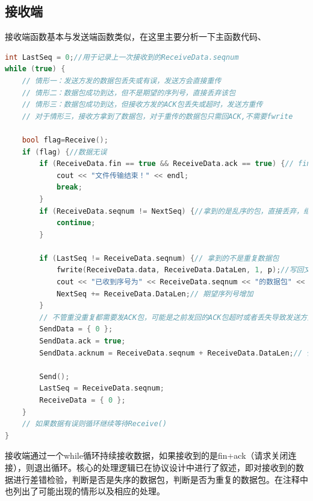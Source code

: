 \documentclass[UTF8,a4paper,10pt]{ctexart}
\begin{document}
\subsection{接收端}
接收端函数基本与发送端函数类似，在这里主要分析一下主函数代码、
\begin{lstlisting}[frame=trbl,language={C++}]
int LastSeq = 0;//用于记录上一次接收到的ReceiveData.seqnum
while (true) {
    // 情形一：发送方发的数据包丢失或有误，发送方会直接重传
    // 情形二：数据包成功到达，但不是期望的序列号，直接丢弃该包
    // 情形三：数据包成功到达，但接收方发的ACK包丢失或超时，发送方重传
    // 对于情形三，接收方拿到了数据包，对于重传的数据包只需回ACK,不需要fwrite
   
    bool flag=Receive();
    if (flag) {//数据无误
        if (ReceiveData.fin == true && ReceiveData.ack == true) {// fin+ack
            cout << "文件传输结束！" << endl;
            break;
        }
        if (ReceiveData.seqnum != NextSeq) {//拿到的是乱序的包，直接丢弃，继续Receive
            continue;
        }
        
        if (LastSeq != ReceiveData.seqnum) {// 拿到的不是重复数据包
            fwrite(ReceiveData.data, ReceiveData.DataLen, 1, p);//写回文件
            cout << "已收到序号为" << ReceiveData.seqnum << "的数据包" << endl;
            NextSeq += ReceiveData.DataLen;// 期望序列号增加
        }
        // 不管重没重复都需要发ACK包，可能是之前发回的ACK包超时或者丢失导致发送方重传（case3)
        SendData = { 0 };
        SendData.ack = true;
        SendData.acknum = ReceiveData.seqnum + ReceiveData.DataLen;// 代表acknum-2个字节流都已成功收到
        
        Send();
        LastSeq = ReceiveData.seqnum;
        ReceiveData = { 0 };
    }
    // 如果数据有误则循环继续等待Receive()
}
\end{lstlisting}\par
接收端通过一个while循环持续接收数据，如果接收到的是fin+ack（请求关闭连接），则退出循环。核心的处理逻辑已在协议设计中进行了叙述，即对接收到的数据进行差错检验，判断是否是失序的数据包，判断是否为重复的数据包。在注释中也列出了可能出现的情形以及相应的处理。
\end{document}
